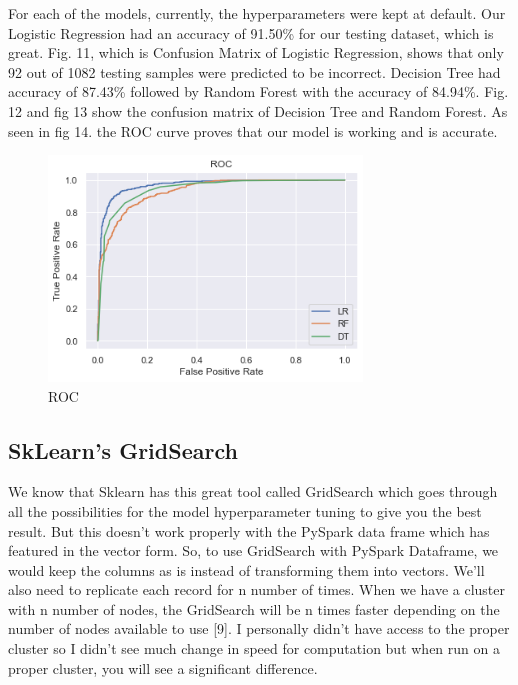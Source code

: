 \documentclass[conference]{IEEEtran}
\begin{document}
For each of the models, currently, the hyperparameters were kept at default. Our Logistic Regression had an accuracy of 91.50\% for our testing dataset, which is great. Fig. 11, which is Confusion Matrix of Logistic Regression, shows that only 92 out of 1082 testing samples were predicted to be incorrect. Decision Tree had accuracy of 87.43\% followed by Random Forest with the accuracy of 84.94\%. Fig. 12 and fig 13 show the confusion matrix of Decision Tree and Random Forest. As seen in fig 14. the ROC curve proves that our model is working and is accurate.

\begin{figure}[!ht]
  \begin{center}
 \includegraphics[height=6cm]{graphics/roc.png}
 \caption{ROC}
 \label{ROC}
 \end{center}
\end{figure}

\subsection{SkLearn's GridSearch}
We know that Sklearn has this great tool called GridSearch which goes through all the possibilities for the model hyperparameter tuning to give you the best result. But this doesn't work properly with the PySpark data frame which has featured in the vector form. So, to use GridSearch with PySpark Dataframe, we would keep the columns as is instead of transforming them into vectors. We'll also need to replicate each record for n number of times. When we have a cluster with n number of nodes, the GridSearch will be n times faster depending on the number of nodes available to use [9]. I personally didn't have access to the proper cluster so I didn't see much change in speed for computation but when run on a proper cluster, you will see a significant difference. 
\end{document}

